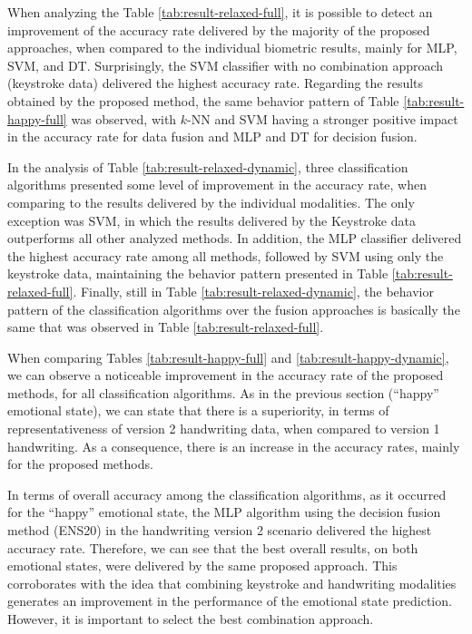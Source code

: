 \documentclass[conference]{IEEEtran}
\begin{document}
When analyzing the Table \ref{tab:result-relaxed-full}, it is possible to detect an improvement of the accuracy rate delivered by the majority of the proposed approaches, when compared to the individual biometric results, mainly for MLP, SVM, and DT. Surprisingly, the SVM classifier with no combination approach (keystroke data) delivered the highest accuracy rate. 
Regarding the results obtained by the proposed method, the same behavior pattern of Table \ref{tab:result-happy-full} was observed, with $k$-NN and SVM having a stronger positive impact in the accuracy rate for data fusion and MLP and DT for decision fusion.

In the analysis of Table \ref{tab:result-relaxed-dynamic},  three classification algorithms presented some level of improvement in the accuracy rate, when comparing to the results delivered by the individual modalities. The only exception was SVM, in which the results delivered by the Keystroke data outperforms all other analyzed methods. In addition, the MLP classifier delivered the highest accuracy rate among all methods, followed by SVM using only the keystroke data, maintaining the behavior pattern presented in Table \ref{tab:result-relaxed-full}. 
Finally, still in Table \ref{tab:result-relaxed-dynamic}, the behavior pattern of the classification algorithms over the fusion approaches is basically the same that was observed in Table \ref{tab:result-relaxed-full}.


When comparing Tables \ref{tab:result-happy-full} and \ref{tab:result-happy-dynamic}, we can observe a noticeable improvement in the accuracy rate of the proposed methods, for all classification algorithms. 
As in the previous section (``happy'' emotional state), we can state that there is a  superiority, in terms of representativeness of version 2 handwriting data, when compared to version 1 handwriting. As a consequence, there is an increase in the accuracy rates, mainly for the proposed methods.

In terms of overall accuracy among the classification algorithms, as it occurred for the ``happy'' emotional state, the MLP algorithm using the decision fusion method (ENS20) in the handwriting version 2 scenario delivered the highest accuracy rate. Therefore, we can see that the best overall results, on both emotional states, were delivered by the same proposed approach. This corroborates with the idea that combining keystroke and handwriting modalities generates an improvement in the performance of the emotional state prediction. However, it is important to select the best combination approach.
\end{document}
